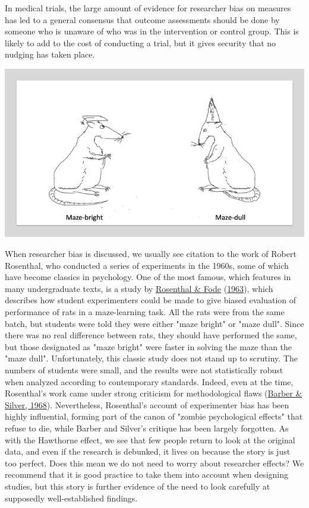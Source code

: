 \documentclass{krantz}
\begin{document}
In medical trials, the large amount of evidence for researcher bias on measures has led to a general consensus that outcome assessments should be done by someone who is unaware of who was in the intervention or control group. This is likely to add to the cost of conducting a trial, but it gives security that no nudging has taken place.

\begin{tcolorbox}[colback=Black!5!lightgray,colframe=black!75!black,coltitle=white,title=Another Questionable Classic Study]\label{box:Rosenthal}

\begin{center}

\includegraphics[width=0.4\linewidth]{images_bw/ratsx2} 
\end{center}
When researcher bias is discussed, we usually see citation to the work of Robert Rosenthal, who conducted a series of experiments in the 1960s, some of which have become classics in psychology. One of the most famous, which features in many undergraduate texts, is a study by \protect\hyperlink{ref-rosenthal1963}{Rosenthal \& Fode} (\protect\hyperlink{ref-rosenthal1963}{1963}), which describes how student experimenters could be made to give biased evaluation of performance of rats in a maze-learning task. All the rats were from the same batch, but students were told they were either "maze bright" or "maze dull". Since there was no real difference between rats, they should have performed the same, but those designated as "maze bright" were faster in solving the maze than the "maze dull".  
Unfortunately, this classic study does not stand up to scrutiny. The numbers of students were small, and the results were not statistically robust when analyzed according to contemporary standards. Indeed, even at the time, Rosenthal's work came under strong criticism for methodological flaws (\protect\hyperlink{ref-barber1968}{Barber \& Silver, 1968}). Nevertheless, Rosenthal's account of experimenter bias has been highly influential, forming part of the canon of "zombie psychological effects" that refuse to die, while Barber and Silver's critique has been largely forgotten. As with the Hawthorne effect, we see that few people return to look at the original data, and even if the research is debunked, it lives on because the story is just too perfect.  
Does this mean we do not need to worry about researcher effects? We recommend that it is good practice to take them into account when designing studies, but this story is further evidence of the need to look carefully at supposedly well-established findings.
\end{tcolorbox}
\end{document}
